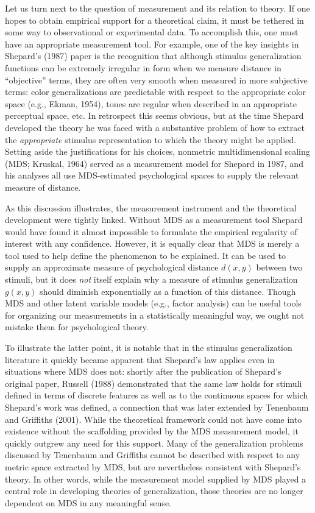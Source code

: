\documentclass[
  english,
  doc]{apa6}
\begin{document}
\noindent
Let us turn next to the question of measurement and its relation to theory. If one hopes to obtain empirical support for a theoretical claim, it must be tethered in some way to observational or experimental data. To accomplish this, one must have an appropriate measurement tool. For example, one of the key insights in Shepard's (1987) paper is the recognition that although stimulus generalization functions can be extremely irregular in form when we measure distance in \enquote{objective} terms, they are often very smooth when measured in more subjective terms: color generalizations are predictable with respect to the appropriate color space (e.g., Ekman, 1954), tones are regular when described in an appropriate perceptual space, etc. In retrospect this seems obvious, but at the time Shepard developed the theory he was faced with a substantive problem of how to extract the \emph{appropriate} stimulus representation to which the theory might be applied. Setting aside the justifications for his choices, nonmetric multidimensional scaling (MDS; Kruskal, 1964) served as a measurement model for Shepard in 1987, and his analyses all use MDS-estimated psychological spaces to supply the relevant measure of distance.

As this discussion illustrates, the measurement instrument and the theoretical development were tightly linked. Without MDS as a measurement tool Shepard would have found it almost impossible to formulate the empirical regularity of interest with any confidence. However, it is equally clear that MDS is merely a tool used to help define the phenomenon to be explained. It can be used to supply an approximate measure of psychological distance \(d(x,y)\) between two stimuli, but it does \emph{not} itself explain why a measure of stimulus generalization \(g(x,y)\) should diminish exponentially as a function of this distance. Though MDS and other latent variable models (e.g., factor analysis) can be useful tools for organizing our measurements in a statistically meaningful way, we ought not mistake them for psychological theory.

To illustrate the latter point, it is notable that in the stimulus generalization literature it quickly became apparent that Shepard's law applies even in situations where MDS does not: shortly after the publication of Shepard's original paper, Russell (1988) demonstrated that the same law holds for stimuli defined in terms of discrete features as well as to the continuous spaces for which Shepard's work was defined, a connection that was later extended by Tenenbaum and Griffiths (2001). While the theoretical framework could not have come into existence without the scaffolding provided by the MDS measurement model, it quickly outgrew any need for this support. Many of the generalization problems discussed by Tenenbaum and Griffiths cannot be described with respect to any metric space extracted by MDS, but are nevertheless consistent with Shepard's theory. In other words, while the measurement model supplied by MDS played a central role in developing theories of generalization, those theories are no longer dependent on MDS in any meaningful sense.
\end{document}
